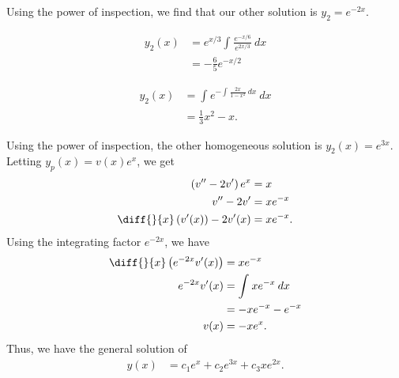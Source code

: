 \documentclass[10pt]{mypackage}
\begin{document}
\begin{solution}[Problem 2]
  Using the power of inspection, we find that our other solution is $y_2 = e^{-2x}$.
\end{solution}
\begin{solution}[Problem 8]
  \begin{align*}
    y_2(x) &= e^{x/3}\int_{}^{} \frac{e^{-x/6}}{e^{2x/3}}\:dx\\
           &= -\frac{6}{5}e^{-x/2}
  \end{align*}
\end{solution}
\begin{solution}[Problem 16]
  \begin{align*}
    y_2(x) &= \int_{}^{} e^{-\int_{}^{} \frac{2x}{1-x^2}\:dx}\:dx\\
           &= \frac{1}{3}x^2 - x.
  \end{align*}
\end{solution}
\begin{solution}[Problem 20]
  Using the power of inspection, the other homogeneous solution is $y_2(x) = e^{3x}$. Letting $y_p(x) = v(x)e^{x}$, we get
  \begin{align*}
    \left(v'' - 2v'\right)e^{x} &= x\\
    v''-2v' &= xe^{-x}\\
    \diff{}{x}\left(v'(x)\right) - 2v'(x) &= xe^{-x}.
  \end{align*}
  Using the integrating factor $e^{-2x}$, we have
  \begin{align*}
    \diff{}{x}\left(e^{-2x}v'(x)\right) &= xe^{-x}\\
    e^{-2x}v'(x) &= \int_{}^{} xe^{-x}\:dx\\
                 &= -xe^{-x} - e^{-x}\\
    v(x) &= -xe^{x}.
  \end{align*}
  Thus, we have the general solution of
  \begin{align*}
    y(x) &= c_1e^{x} + c_2e^{3x} + c_3xe^{2x}.
  \end{align*}
\end{solution}
\begin{solution}[Problem 22]

\end{solution}
\end{document}

